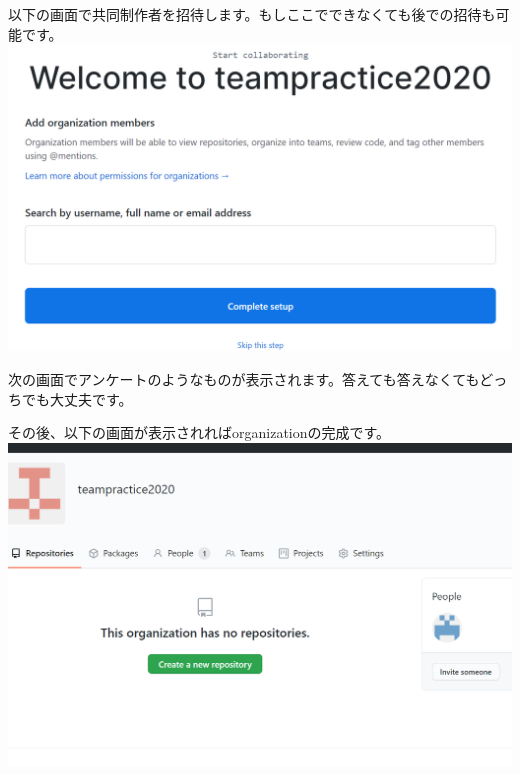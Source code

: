 \documentclass[
]{book}
\begin{document}
以下の画面で共同制作者を招待します。もしここでできなくても後での招待も可能です。
\includegraphics{pics/search.png}

次の画面でアンケートのようなものが表示されます。答えても答えなくてもどっちでも大丈夫です。

その後、以下の画面が表示されればorganizationの完成です。
\includegraphics{pics/organization2.png}
\end{document}
